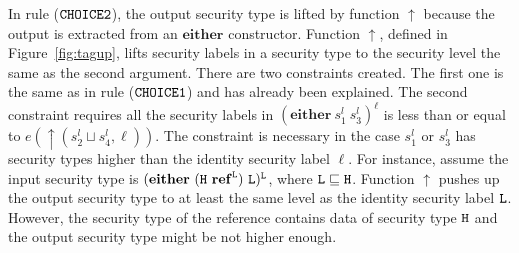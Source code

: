 \documentclass[a4paper]{report}
\newcommand{\co}[1]{$\cod{#1}$}
\newcommand{\sts}[1]{s_{#1}^l}
\newcommand{\tagup}{\uparrow}
\begin{document}
In rule (\co{CHOICE2}), the output security type is lifted by function $\tagup$ because the
output is extracted from an $\mathbf{either}$ constructor. 
Function $\tagup$, defined in Figure~\ref{fig:tagup}, lifts security labels in a security type 
to the security level the same as the second argument.
There are two constraints created. The first one is the same as
in rule (\co{CHOICE1}) and has already been explained. The second constraint 
requires all the security labels in $(\mathbf{either}\ \sts{1}\ \sts{3})^\ell$ is less than or
equal to $e(\tagup (\sts{2}\sqcup \sts{4},\ell))$.
The constraint is necessary in the case $\sts{1}$ or $\sts{3}$ has security types higher than
the identity security label $\ell$.
For instance, assume the input security type is 
$(\mathbf{either}\ (\cod{H}~\mathbf{ref}^{\cod{L}})\ \cod{L})^{\cod{L}}$, where $\mathtt{L}\sqsubseteq\mathtt{H}$.
Function $\tagup$ pushes up the output security type to at least the same level as the identity security 
label \co{L}.
However, the security type of the reference contains data of security type \co{H} and the output
security type might be not higher enough.
\end{document}
